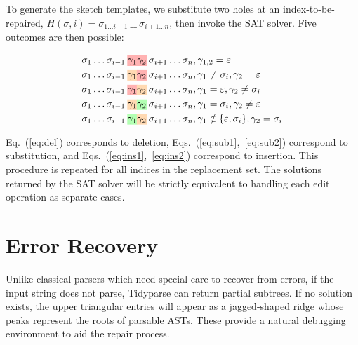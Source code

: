 \documentclass[sigplan,review,anonymous,acmsmall]{acmart}\settopmatter{printfolios=false,printccs=false,printacmref=false}
\begin{document}
    \vspace{5pt}
    \noindent To generate the sketch templates, we substitute two holes at an index-to-be-repaired, $H(\sigma, i) = \sigma_{1\ldots i-1}\:\texttt{\_ \_}\:\sigma_{i+1\ldots n}$, then invoke the SAT solver. Five outcomes are then possible:

    \begin{align}
        &\sigma_{1}\ldots\sigma_{i-1}\:\text{\hlred{$\gamma_1$}\hlred{$\gamma_2$}}\:\sigma_{i+1}\ldots\sigma_{n}, \gamma_{1, 2} = \varepsilon\label{eq:del}\\
        &\sigma_{1}\ldots \sigma_{i-1}\:\text{\hlorange{$\gamma_1$}\hlred{$\gamma_2$}}\:\sigma_{i+1}\ldots \sigma_{n}, \gamma_1 \neq \sigma_i, \gamma_2 = \varepsilon\label{eq:sub1}\\
        &\sigma_{1}\ldots \sigma_{i-1}\:\text{\hlred{$\gamma_1$}\hlorange{$\gamma_2$}}\:\sigma_{i+1}\ldots \sigma_{n}, \gamma_1 = \varepsilon, \gamma_2 \neq \sigma_i\label{eq:sub2}\\
        &\sigma_{1}\ldots\sigma_{i-1}\: \text{\hlorange{$\gamma_1$}\hlgreen{$\gamma_2$}}\:\sigma_{i+1}\ldots\sigma_{n}, \gamma_1 = \sigma_i, \gamma_2 \neq \varepsilon\label{eq:ins1}\\
        &\sigma_{1}\ldots\sigma_{i-1}\: \text{\hlgreen{$\gamma_1$}\hlorange{$\gamma_2$}}\:\sigma_{i+1}\ldots\sigma_{n}, \gamma_1 \notin \{\varepsilon, \sigma_i\}, \gamma_2 = \sigma_i\label{eq:ins2}
    \end{align}

    \noindent Eq.~(\ref{eq:del}) corresponds to deletion, Eqs.~(\ref{eq:sub1},~\ref{eq:sub2}) correspond to substitution, and Eqs.~(\ref{eq:ins1},~\ref{eq:ins2}) correspond to insertion. This procedure is repeated for all indices in the replacement set. The solutions returned by the SAT solver will be strictly equivalent to handling each edit operation as separate cases.

    \section{Error Recovery}\label{sec:error}

    Unlike classical parsers which need special care to recover from errors, if the input string does not parse, Tidyparse can return partial subtrees. If no solution exists, the upper triangular entries will appear as a jagged-shaped ridge whose peaks represent the roots of parsable ASTs. These provide a natural debugging environment to aid the repair process.
\end{document}
